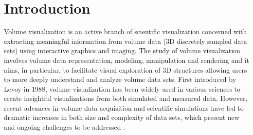 \chapter{Introduction \label{section_introduction}}


Volume visualization is an active branch of scientific visualization concerned with extracting meaningful information from volume data (3D discretely sampled data sets) using interactive graphics and imaging. The study of volume visualization involves volume data representation, modeling, manipulation and rendering \cite{kaufman_volume_1997} and it aims, in particular, to facilitate visual exploration of 3D structures allowing users to more deeply understand and analyze volume data sets. 
First introduced by Levoy \cite{levoy_display_1988} in 1988, volume visualization has been widely used in various sciences to create insightful visualizations from both simulated and measured data. However, recent advances in volume data acquisition and scientific simulations have led to dramatic increases in both size and complexity of data sets, which present new and ongoing challenges to be addressed \cite{beyer_state---art_2015}.



